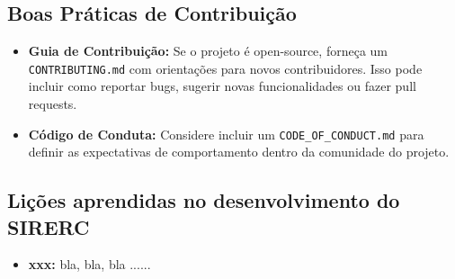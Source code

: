 \documentclass[a4paper,11pt]{article}
\newcommand{\sistema}{\textsf{SIRERC}}
\begin{document}
\subsection{Boas Práticas de Contribuição}
\begin{itemize}
	\item \textbf{Guia de Contribuição:} Se o projeto é open-source, forneça um \texttt{CONTRIBUTING.md} com orientações para novos contribuidores. Isso pode incluir como reportar bugs, sugerir novas funcionalidades ou fazer pull requests.
	\item \textbf{Código de Conduta:} Considere incluir um \texttt{CODE\_OF\_CONDUCT.md} para definir as expectativas de comportamento dentro da comunidade do projeto.
\end{itemize}

\subsection{Lições aprendidas no desenvolvimento do \sistema{}}
\begin{itemize}
	\item \textbf{xxx:} bla, bla, bla ......
\end{itemize}
\end{document}

